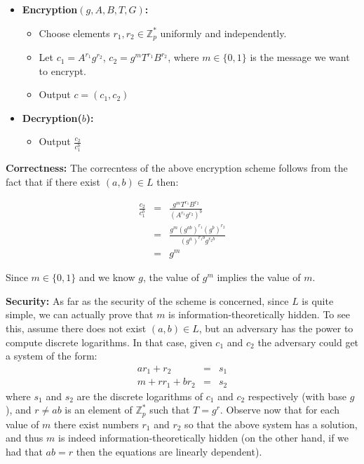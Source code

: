 \begin{itemize}

\item \textbf{Encryption$(g,A,B,T,G)$:}

\begin{itemize}
\item Choose elements $r_1, r_2 \in \mathbb{Z}_p^*$ uniformly and independently.

\item Let $c_1 = A^{r_1} g^{r_2} $, $c_2 =  g^m T^{r_1} B^{r_2}$, where $m \in \{0,1\}$ is the message we want to encrypt.

\item Output $c = (c_1, c_2)$

\end{itemize}

\item \textbf{Decryption($b$):}


\begin{itemize}

\item Output $\frac{c_2}{c_1^b}$

\end{itemize}

\end{itemize}


\textbf{Correctness:}
The correcntess of the above encryption scheme follows from the fact that if there exist $(a,b) \in L$ then:

\begin{eqnarray*}
\frac{c_2}{c_1^b} & = &  \frac{g^m T^{r_1} B^{r_2}  }{ \left( A^{r_1}g^{r_2}\right)^b } \\
& = & \frac{g^m \left(g^{ab}\right)^{r_1} \left( g^{b} \right)^{r_2}  }{ \left( g^{a} \right)^{r_1 b} g^{r_2 b} } \\
& = & g^{m}
\end{eqnarray*}

Since $m \in \{0,1\}$ and we know $g$, the value of $g^m$ implies the value of $m$.

\smallskip
\textbf{Security:}
As far as the security of the scheme is concerned, since $L$ is quite simple, we can actually prove that $m$ is information-theoretically hidden. To see this, assume there does not exist $(a,b) \in L$, but an adversary has the power to compute discrete logarithms. In that case, given $c_1$ and $c_2$ the adversary could get a system of the form:
\begin{eqnarray*}
ar_1 + r_2 & = & s_1 \\
m + r r_1 + b r_2 &=& s_2
\end{eqnarray*}
where $s_1$ and $s_2$ are   the discrete logarithms of $c_1$ and $c_2$ respectively (with base $g$), and $r \ne ab$ is an element of $  \mathbb{Z}_{p}^*$ such that $T = g^r$. Observe now that for each value of $m$ there exist numbers $r_1$ and $r_2$ so that the above system has a solution, and thus $m$ is indeed information-theoretically hidden (on the other hand, if we had that $ab = r$ then the equations are linearly dependent).

